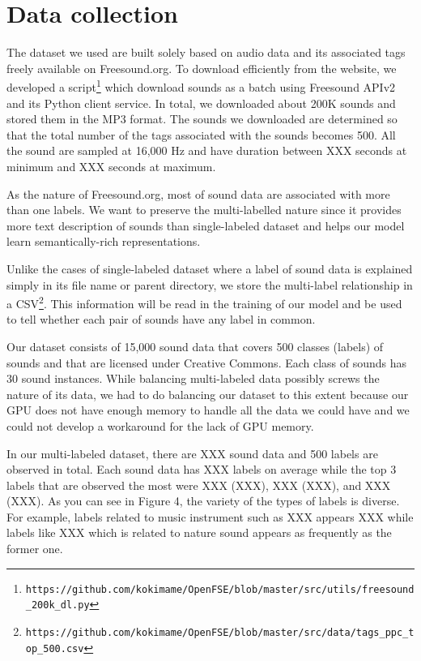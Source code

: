 \clearpage

\section{Data collection}
The dataset we used are built solely based on audio data and its associated tags freely available on Freesound.org. To download efficiently from the website, we developed a script\footnote{\texttt{https://github.com/kokimame/OpenFSE/blob/master/src/utils/freesound\_200k\_dl.py}} which download sounds as a batch using Freesound APIv2 and its Python client service. In total, we downloaded about 200K sounds and stored them in the MP3 format. The sounds we downloaded are determined so that the total number of the tags associated with the sounds becomes 500. All the sound are sampled at 16,000 Hz and have duration between XXX seconds at minimum and XXX seconds at maximum.

As the nature of Freesound.org, most of sound data are associated with more than one labels. We want to preserve the multi-labelled nature since it provides more text description of sounds than single-labeled dataset and helps our model learn semantically-rich representations. 

Unlike the cases of single-labeled dataset where a label of sound data is explained simply in its file name or parent directory, we store the multi-label relationship in a CSV\footnote{\texttt{https://github.com/kokimame/OpenFSE/blob/master/src/data/tags\_ppc\_top\_500.csv}}. This information will be read in the training of our model and be used to tell whether each pair of sounds have any label in common.

Our dataset consists of 15,000 sound data that covers 500 classes (labels) of sounds and that are licensed under Creative Commons. Each class of sounds has 30 sound instances. While balancing multi-labeled data possibly screws the nature of its data, we had to do balancing our dataset to this extent because our GPU does not have enough memory to handle all the data we could have and we could not develop a workaround for the lack of GPU memory. 

In our multi-labeled dataset, there are XXX sound data and 500 labels are observed in total. Each sound data has XXX labels on average while the top 3 labels that are observed the most were XXX (XXX), XXX (XXX), and XXX (XXX). As you can see in Figure 4, the variety of the types of labels is diverse. For example, labels related to music instrument such as XXX appears XXX while labels like XXX which is related to nature sound appears as frequently as the former one.

